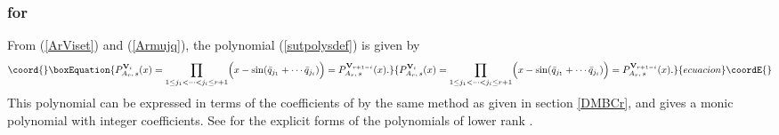 \documentclass[a4paper,12pt]{article}
\begin{document}
\subsubsection{\coordHE{} for \coordHE{}}

{}From (\ref{ArViset}) and (\ref{Armujq}), the polynomial (\ref{sutpolysdef})
is given by
\begin{equation}\coord{}\boxEquation{
   P_{A_r,\,s}^{{\bf V}_i}(x)=\prod_{1\leq j_1<\cdots<j_i\leq r+1}
   \Bigl(x-\sin(\bar{q}_{j_1}+\cdots\bar{q}_{j_i})\Bigr)
   =P_{A_r,\,s}^{{\bf V}_{r+1-i}}(x).
   \label{ArVis}
}{
   P_{A_r,\,s}^{{\bf V}_i}(x)=\prod_{1\leq j_1<\cdots<j_i\leq r+1}
   \Bigl(x-\sin(\bar{q}_{j_1}+\cdots\bar{q}_{j_i})\Bigr)
   =P_{A_r,\,s}^{{\bf V}_{r+1-i}}(x).
   }{ecuacion}\coordE{}\end{equation}
This polynomial can be expressed in terms of the coefficients of \coordHE{}
by the same method as given in section \ref{DMBCr}, and 
\coordHE{} gives a monic polynomial with 
integer coefficients.
See \cite{poly} for the explicit forms of the polynomials 
\coordHE{} of lower rank \coordHE{}.
\end{document}
